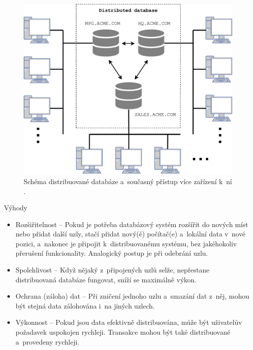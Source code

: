 \begin{figure}[!h]
  \centering
  \includegraphics[width=13cm]{template-fig/DistributedDatabase.pdf}
  \caption{Schéma distribuované databáze a~současný přístup více zařízení k~ní \cite{distributedDBMSPic}.}
  \label{FIG_DistrDB}
\end{figure}

\noindent Výhody
\begin{itemize}
\item Rozšiřitelnost -- Pokud je potřeba databázový systém rozšířit do nových míst nebo přidat další uzly, stačí přidat nový(é) počítač(e) a~lokální data v~nové pozici, a~nakonec je připojit k~distribuovanému systému, bez jakéhokoliv přerušení funkcionality. Analogický postup je při odebrání uzlu.

\item Spolehlivost -- Když nějaký z~připojených uzlů selže, nepřestane distribuovaná databáze fungovat, sníží se maximálně výkon.

\item Ochrana (záloha) dat -- Při zničení jednoho uzlu a~smazání dat z~něj, mohou být stejná data zálohována i~na jiných uzlech.

\item Výkonnost -- Pokud jsou data efektivně distribuována, může být uživatelův požadavek uspokojen rychleji. Transakce mohou být také distribuované a~provedeny rychleji. 
\end{itemize}

